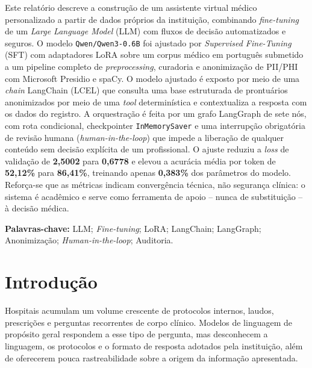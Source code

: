\documentclass[12pt,a4paper]{article}
\begin{document}
\noindent
Este relatório descreve a construção de um assistente virtual médico
personalizado a partir de dados próprios da instituição, combinando
\emph{fine-tuning} de um \emph{Large Language Model} (LLM) com fluxos de decisão
automatizados e seguros. O modelo \texttt{Qwen/Qwen3-0.6B} foi ajustado por
\emph{Supervised Fine-Tuning} (SFT) com adaptadores LoRA sobre um corpus médico
em português submetido a um pipeline completo de \emph{preprocessing}, curadoria
e anonimização de PII/PHI com Microsoft Presidio e spaCy. O modelo ajustado é
exposto por meio de uma \emph{chain} LangChain (LCEL) que consulta uma base
estruturada de prontuários anonimizados por meio de uma \emph{tool} determinística
e contextualiza a resposta com os dados do registro. A orquestração é feita por
um grafo LangGraph de sete nós, com rota condicional, checkpointer
\texttt{InMemorySaver} e uma interrupção obrigatória de revisão humana
(\emph{human-in-the-loop}) que impede a liberação de qualquer conteúdo sem
decisão explícita de um profissional. O ajuste reduziu a \emph{loss} de validação
de \textbf{2,5002} para \textbf{0,6778} e elevou a acurácia média por token de
\textbf{52,12\%} para \textbf{86,41\%}, treinando apenas \textbf{0,383\%} dos
parâmetros do modelo. Reforça-se que as métricas indicam convergência técnica,
não segurança clínica: o sistema é acadêmico e serve como ferramenta de apoio --
nunca de substituição -- à decisão médica.

\vspace{0.6cm}
\noindent
\textbf{Palavras-chave:} LLM; \emph{Fine-tuning}; LoRA; LangChain; LangGraph;
Anonimização; \emph{Human-in-the-loop}; Auditoria.

\newpage

\tableofcontents
\newpage

\section{Introdução}

Hospitais acumulam um volume crescente de protocolos internos, laudos,
prescrições e perguntas recorrentes de corpo clínico. Modelos de linguagem de
propósito geral respondem a esse tipo de pergunta, mas desconhecem a linguagem,
os protocolos e o formato de resposta adotados pela instituição, além de
oferecerem pouca rastreabilidade sobre a origem da informação apresentada.
\end{document}
